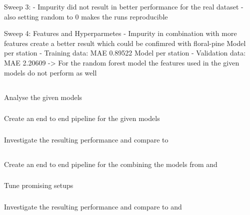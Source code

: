 \documentclass[a4paper]{article}
\begin{document}
    Sweep 3:
    - Impurity did not result in better performance for the real dataset
    - also setting random to 0 makes the runs reproducible

    Sweep 4: Features and Hyperparmetes
    - Impurity in combination with more features create a better result which could be confimred with floral-pine
    Model per station - Training data: MAE 0.89522
    Model per station - Validation data: MAE 2.20609
    -> For the random forest model the features used in the given models do not perform as well

    \subsection*{}
    \subsubsection*{} Analyse the given models
    \subsubsection*{} Create an end to end pipeline for the given models
    \subsubsection*{} Investigate the resulting performance and compare to 

    \subsection*{}
    \subsubsection*{} Create an end to end pipeline for the combining the models from  and 
    \subsubsection*{} Tune promising setups
    \subsubsection*{} Investigate the resulting performance and compare to  and 
\end{document}
